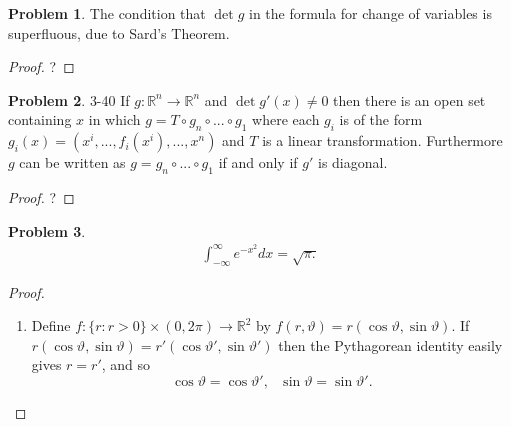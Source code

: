 \documentclass[20pt]{article}
\theoremstyle{plain}
\theoremstyle{definition}
\newtheorem*{problem}{Problem}
\newcommand{\reals}{\mathbb{R}}
\begin{document}
\begin{problem}{3.39}
  The condition that $\det g$ in the formula for change of variables is
  superfluous, due to Sard's Theorem.
\end{problem}
\begin{proof}
  \color{ForestGreen} ?
\end{proof}



\begin{problem}{3-40}
  If $g: \reals^n \to \reals^n$ and $\det g'(x) \neq 0$ then 
  there is an open set containing $x$ in which 
  $g = T \circ g_n \circ ... \circ g_1$ where each $g_i$
  is of the form $g_i(x) = (x^i, ..., f_i(x^i), ..., x^n)$
  and $T$ is a linear transformation.  Furthermore $g$ can be written as $g = g_n \circ...\circ g_1$ if and only if $g'$ is 
  diagonal.
\end{problem}

\begin{proof}
  \color{ForestGreen} ?
\end{proof}

\begin{problem}
  \begin{align*}
    \int_{-\infty}^\infty e^{-x^2}dx = \sqrt{\pi.}
  \end{align*}
\end{problem}

\begin{proof}
  \begin{enumerate}
    \item Define $f: \{r: r > 0 \} \times (0, 2\pi) \to \reals^2$ by
    $f(r, \vartheta) = r(\cos \vartheta, \sin \vartheta).$
    If $r(\cos \vartheta, \sin \vartheta) = r'(\cos \vartheta', \sin \vartheta')$
    then the Pythagorean identity easily gives $r = r'$, and so 
    $$\cos \vartheta = \cos \vartheta',\ \ \  \sin \vartheta = \sin \vartheta'.$$




  \end{enumerate}
\end{proof}
\end{document}
